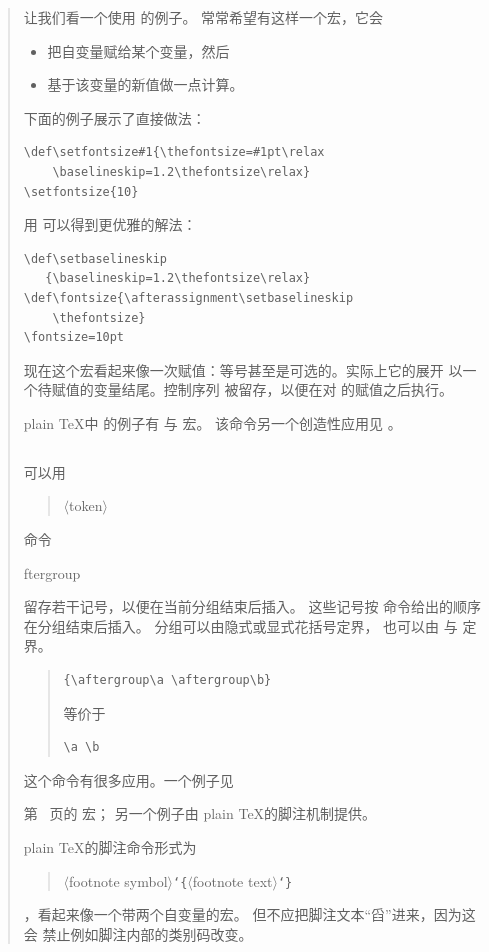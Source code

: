 \documentclass[a4paper]{rapport3}
\makeatletter
\def\lb{{\tt\char`\{}}\def\rb{{\tt\char`\}}}
\def\gr#1{$\langle$#1$\rangle$}\def\key#1{{\tt#1}}
\def\alt{}\def\altt{}%
\newenvironment{disp}{\begin{quotation}}{\end{quotation}}
\newenvironment{example}{\begin{quotation}}{\end{quotation}}
\def\cstoidx#1\par{\index{#1@\cs{#1}}}
\makeatother
\begin{document}
\begin{disp}
让我们看一个使用  的例子。
常常希望有这样一个宏，它会
\begin{itemize} \item 把自变量赋给某个变量，然后
\item 基于该变量的新值做一点计算。\end{itemize}
下面的例子展示了直接做法：
\begin{verbatim}
\def\setfontsize#1{\thefontsize=#1pt\relax
    \baselineskip=1.2\thefontsize\relax}
\setfontsize{10}
\end{verbatim}
用  可以得到更优雅的解法：
\begin{verbatim}
\def\setbaselineskip
   {\baselineskip=1.2\thefontsize\relax}
\def\fontsize{\afterassignment\setbaselineskip
    \thefontsize}
\fontsize=10pt
\end{verbatim}
现在这个宏看起来像一次赋值：等号甚至是可选的。实际上它的展开
以一个待赋值的变量结尾。控制序列 
被留存，以便在对  的赋值之后执行。

plain \TeX 中  的例子有
 与  宏。
该命令另一个创造性应用见 \cite{Maus}。

\subsection{\protect{}}

可以用 \begin{disp}\gr{token}\end{disp} 命令
\cstoidx aftergroup\par
留存若干记号，以便在当前分组结束后插入。
这些记号按  命令给出的顺序
在分组结束后插入。
分组可以由隐式或显式花括号定界，
也可以由  与  定界。

\begin{example}\begin{verbatim}
{\aftergroup\a \aftergroup\b}
\end{verbatim}
等价于 \begin{verbatim}
\a \b
\end{verbatim}
\end{example}

这个命令有很多应用。一个例子见
\alt
第~\pageref{text:vcenter} 页的  宏；
另一个例子由 plain \TeX 的脚注机制提供。

plain \TeX 的脚注命令形式为
\label{footnote:ex}
\begin{disp}\gr{footnote symbol}\lb\gr{footnote text}\rb
\end{disp}，看起来像一个带两个自变量的宏。
但不应把脚注文本“舀”进来，因为这会
禁止例如脚注内部的类别码改变。


\end{disp}
\end{document}
